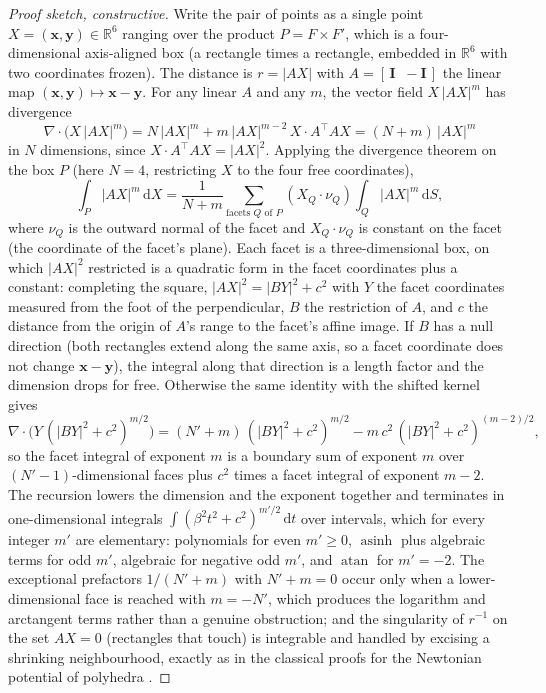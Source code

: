 \documentclass[11pt]{article}
\theoremstyle{remark}
\newcommand{\dd}{\mathrm{d}}
\newcommand{\asinh}{\operatorname{asinh}}
\newcommand{\atan}{\operatorname{atan}}
\newcommand{\Rr}{\mathbb{R}}
\begin{document}
\begin{proof}[Proof sketch, constructive]
Write the pair of points as a single point $X = (\mathbf{x},\mathbf{y})\in\Rr^6$
ranging over the product $P = F\times F'$, which is a four-dimensional axis-aligned
box (a rectangle times a rectangle, embedded in $\Rr^6$ with two coordinates frozen).
The distance is $r = |AX|$ with $A = [\,\mathbf{I}\;\; -\mathbf{I}\,]$ the linear map
$(\mathbf{x},\mathbf{y})\mapsto \mathbf{x}-\mathbf{y}$. For any linear $A$ and any
$m$, the vector field $X\,|AX|^m$ has divergence
\begin{equation}
\nabla\cdot\bigl(X\,|AX|^m\bigr) = N\,|AX|^m + m\,|AX|^{m-2}\,X\cdot A^{\!\top}\!A X
= (N+m)\,|AX|^m
\label{eq:divid}
\end{equation}
in $N$ dimensions, since $X\cdot A^{\top}AX = |AX|^2$. Applying the divergence theorem
on the box $P$ (here $N = 4$, restricting $X$ to the four free coordinates),
\begin{equation}
\int_P |AX|^m\,\dd X = \frac{1}{N+m}\sum_{\text{facets } Q\text{ of } P} (X_Q\cdot\nu_Q)\int_Q |AX|^m\,\dd S,
\end{equation}
where $\nu_Q$ is the outward normal of the facet and $X_Q\cdot\nu_Q$ is constant on
the facet (the coordinate of the facet's plane). Each facet is a three-dimensional
box, on which $|AX|^2$ restricted is a quadratic form in the facet coordinates plus a
constant: completing the square, $|AX|^2 = |BY|^2 + c^2$ with $Y$ the facet
coordinates measured from the foot of the perpendicular, $B$ the restriction of $A$,
and $c$ the distance from the origin of $A$'s range to the facet's affine image. If
$B$ has a null direction (both rectangles extend along the same axis, so a facet
coordinate does not change $\mathbf{x}-\mathbf{y}$), the integral along that
direction is a length factor and the dimension drops for free. Otherwise the same
identity with the shifted kernel gives
\begin{equation}
\nabla\cdot\bigl(Y\,(|BY|^2+c^2)^{m/2}\bigr) = (N'+m)\,(|BY|^2+c^2)^{m/2} - m\,c^2\,(|BY|^2+c^2)^{(m-2)/2},
\end{equation}
so the facet integral of exponent $m$ is a boundary sum of exponent $m$ over
$(N'-1)$-dimensional faces plus $c^2$ times a facet integral of exponent $m-2$. The
recursion lowers the dimension and the exponent together and terminates in
one-dimensional integrals $\int (\beta^2 t^2 + c^2)^{m'/2}\,\dd t$ over intervals,
which for every integer $m'$ are elementary: polynomials for even $m'\ge 0$,
$\asinh$ plus algebraic terms for odd $m'$, algebraic for negative odd $m'$, and
$\atan$ for $m' = -2$. The exceptional prefactors $1/(N'+m)$ with $N'+m = 0$ occur
only when a lower-dimensional face is reached with $m = -N'$, which produces the
logarithm and arctangent terms rather than a genuine obstruction; and the
singularity of $r^{-1}$ on the set $AX = 0$ (rectangles that touch) is integrable and
handled by excising a shrinking neighbourhood, exactly as in the classical proofs for
the Newtonian potential of polyhedra \cite{waldvogel,hummer}.
\end{proof}
\end{document}
